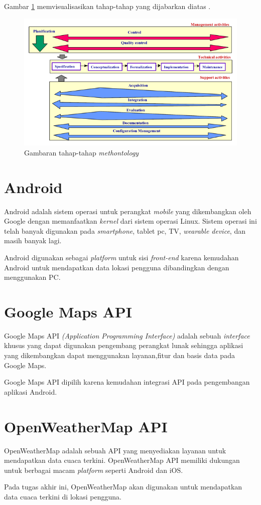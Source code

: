 \par
Gambar \ref{fig:methontologyfig} memvisualisasikan tahap-tahap yang dijabarkan diatas \cite{methontologyvis}.
\begin{figure}[h!]
    \centering
    \includegraphics[scale=0.5]{img/methontology_cycle.png}
    \caption{Gambaran tahap-tahap \textit{methontology}}
    \label{fig:methontologyfig}
\end{figure}

\section{Android}
Android adalah sistem operasi untuk perangkat \textit{mobile} yang dikembangkan oleh Google dengan memanfaatkan \textit{kernel} dari sistem operasi Linux. Sistem operasi ini telah banyak digunakan pada \textit{smartphone}, tablet pc, TV, \textit{wearable device}, dan masih banyak lagi.

Android digunakan sebagai \textit{platform} untuk sisi \textit{front-end} karena kemudahan Android untuk mendapatkan data lokasi pengguna dibandingkan dengan menggunakan PC.

\section{Google Maps API}
Google Maps API \textit{(Application Programming Interface)} adalah sebuah \textit{interface} khusus yang dapat digunakan pengembang perangkat lunak sehingga aplikasi yang dikembangkan dapat menggunakan layanan,fitur dan basis data pada Google Maps.
\par
Google Maps API dipilih karena kemudahan integrasi API pada pengembangan aplikasi Android.  

\section{OpenWeatherMap API}
OpenWeatherMap adalah sebuah API yang menyediakan layanan untuk mendapatkan data cuaca terkini. OpenWeatherMap API memiliki dukungan untuk berbagai macam \textit{platform} seperti Android dan iOS.
\par
Pada tugas akhir ini, OpenWeatherMap akan digunakan untuk mendapatkan data cuaca terkini di lokasi pengguna.

